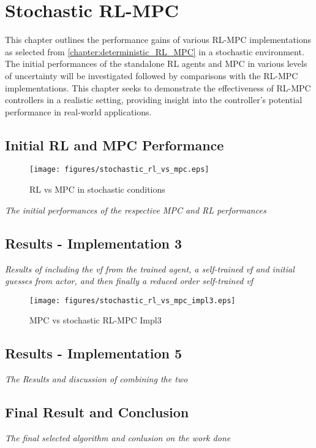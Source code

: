 \chapter{Stochastic RL-MPC}
\label{chapter:stochastic_RL_MPC}

This chapter outlines the performance gains of various RL-MPC implementations as selected from \autoref{chapter:deterministic_RL_MPC} in a stochastic environment. The initial performances of the standalone RL agents and MPC in various levels of uncertainty will be investigated followed by comparisons with the RL-MPC implementations. This chapter seeks to demonstrate the effectiveness of RL-MPC controllers in a realistic setting, providing insight into the controller's potential performance in real-world applications.

\section{Initial RL and MPC Performance}

\begin{figure}[H]
	\centering
	\texttt{[image: figures/stochastic\_rl\_vs\_mpc.eps]}
	\caption{RL vs MPC in stochastic conditions}
	\label{fig:stochastic-rl-vs-mpc}
\end{figure}

\emph{The initial performances of the respective MPC and RL performances}

\section{Results - Implementation 3}
\emph{Results of including the vf from the trained agent, a self-trained vf and initial guesses from actor, and then finally a reduced order self-trained vf}

\begin{figure}[H]
	\centering
	\texttt{[image: figures/stochastic\_rl\_vs\_mpc\_impl3.eps]}
	\caption{MPC vs stochastic RL-MPC Impl3}
	\label{fig:stochastic-rlmpc-impl3}
\end{figure}



\section{Results - Implementation 5}
\emph{The Results and discussion of combining the two}


\section{Final Result and Conclusion}
\emph{The final selected algorithm and conlusion on the work done}